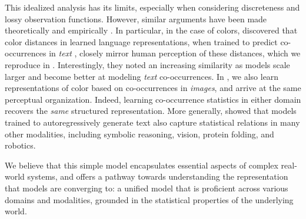
This idealized analysis has its limits, especially when considering discreteness and lossy observation functions. However, similar arguments have been made theoretically and empirically \citep{zimmermann2021contrastive}. 
In particular, in the case of colors, \citet{abdou2021can} discovered that color distances in learned language representations, when trained to predict co-occurrences in \emph{text} \citep{devlin2018bert}, closely mirror human perception of these distances, which we reproduce in . Interestingly, they noted an increasing similarity as models scale larger and become better at modeling \emph{text} co-occurrences. In , we also learn representations of color based on co-occurrences in \emph{images}, and arrive at the same perceptual organization. 
Indeed, learning co-occurrence statistics in either domain recovers the \emph{same} structured representation. More generally, \citet{lu2021pretrained,mirchandani2023large} showed that models trained to autoregressively generate text also capture statistical relations in many other modalities, including symbolic reasoning, vision, protein folding, and robotics.

We believe that this simple model encapsulates essential aspects of complex real-world systems, and offers a pathway towards understanding the representation that models are converging to: a unified model that is proficient across various domains and modalities, grounded in the statistical properties of the underlying world.



